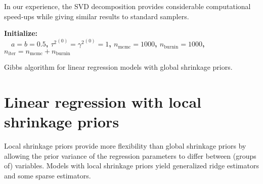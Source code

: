 \documentclass[nojss]{jss}
\begin{document}
In our experience, the SVD decomposition provides
considerable computational speed-ups while giving similar results to
standard samplers.

\begin{algorithm}[h]
\DontPrintSemicolon
\label{algo1}
\bf{Initialize:}\\
$\quad a=b=0.5$, ${\tau^2}^{(0)} = {\gamma^2}^{(0)} = 1$, $n_{\mathrm{mcmc}}=1000$, $n_{\mathrm{burnin}}=1000$, $n_{\mathrm{iter}} = n_{\mathrm{mcmc}} + n_{\mathrm{burnin}}$

\caption{Gibbs algorithm for linear regression models with global shrinkage priors.}
\end{algorithm}

\newpage
\section{Linear regression with local shrinkage priors}

Local shrinkage priors provide more flexibility than global shrinkage priors by
allowing the prior variance of the regression parameters to differ between
(groups of) variables. Models with local shrinkage priors yield generalized
ridge estimators and some sparse estimators.
\end{document}

